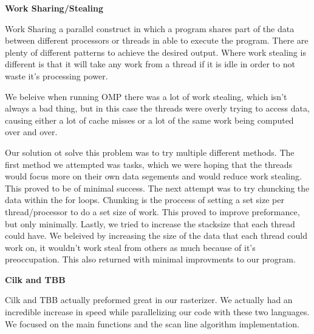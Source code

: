 \begin{center}
    \Large\textbf{Work Sharing/Stealing}\\
\end{center}
    Work Sharing a parallel construct in which a program shares part of the data between different processors or threads in able to execute the program. There are plenty of different patterns to achieve the desired output. Where work stealing is different is that it will take any work from a thread if it is idle in order to not waste it's processing power. 

    We beleive when running OMP there was a lot of work stealing, which isn't always a bad thing, but in this case the threads were overly trying to access data, causing either a lot of cache misses or a lot of the same work being computed over and over.

    Our solution ot solve this problem was to try multiple different methods. The first method we attempted was tasks, which we were hoping that the threads would focus more on their own data segements and would reduce work stealing. This proved to be of minimal success. The next attempt was to try chuncking the data within the for loops. Chunking is the proccess of setting a set size per thread/processor to do a set size of work. This proved to improve preformance, but only minimally. Lastly, we tried to increase the stacksize that each thread could have. We beleived by increasing the size of the data that each thread could work on, it wouldn't work steal from others as much because of it's preoccupation. This also returned with minimal improvments to our program.

\begin{center}
    \Large\textbf{Cilk and TBB}\\
\end{center}

    Cilk and TBB actually preformed great in our rasterizer. We actually had an incredible increase in speed while parallelizing our code with these two languages. We focused on the main functions and the scan line algorithm implementation. 
    
